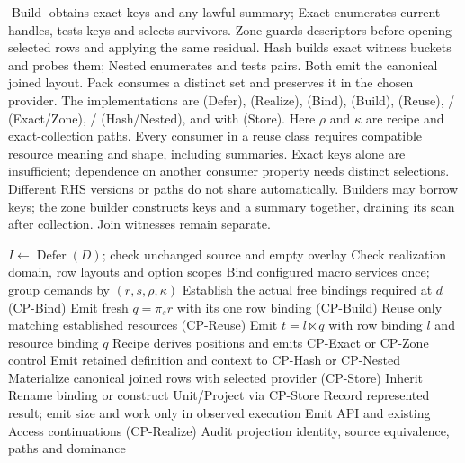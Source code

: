 $\operatorname{Build}$ obtains exact keys and any lawful summary; Exact enumerates
current handles, tests keys and selects survivors. Zone guards descriptors before
opening selected rows and applying the same residual. Hash builds exact witness
buckets and probes them; Nested enumerates and tests pairs. Both emit the canonical
joined layout. Pack consumes a distinct set and preserves it in the chosen provider.
The implementations are  (Defer),
 (Realize),  (Bind),
 (Build),  (Reuse),
/ (Exact/Zone),
/ (Hash/Nested), and
 with  (Store).
Here $\rho$ and $\kappa$ are recipe and exact-collection paths. Every consumer
in a reuse class requires compatible resource meaning and shape, including summaries.
Exact keys alone are insufficient; dependence on another consumer property needs
distinct selections. Different RHS versions or paths do not share automatically.
Builders may borrow keys; the zone builder constructs keys and a summary together,
draining its scan after collection. Join witnesses remain separate.

\begin{algorithm}[!t]
\caption{Contextual composition in the existing stage order}
\label{alg:block-ra}
\begin{algorithmic}[1]
 \State $I\gets\operatorname{Defer}(D)$; check unchanged source and empty overlay
 \State Check realization domain, row layouts and option scopes
 \State Bind configured macro services once; group demands by $(r,s,\rho,\kappa)$
  \State Establish the actual free bindings required at $d$ (CP-Bind)
   \State Emit fresh $q=\pi_s r$ with its one row binding (CP-Build)
  \EndFor
  \State Reuse only matching established resources (CP-Reuse)
   \State Emit $t=l\ltimes q$ with row binding $l$ and resource binding $q$
   \State Recipe derives positions and emits CP-Exact or CP-Zone control
   \State Emit retained definition and context to CP-Hash or CP-Nested
   \State Materialize canonical joined rows with selected provider (CP-Store)
  \Else
   \State Inherit Rename binding or construct Unit/Project via CP-Store
  \EndIf
  \State Record represented result; emit size and work only in observed execution
 \EndFor
 \State Emit API and existing Access continuations (CP-Realize)
 \State Audit projection identity, source equivalence, paths and dominance
\EndProcedure
\end{algorithmic}
\end{algorithm}


